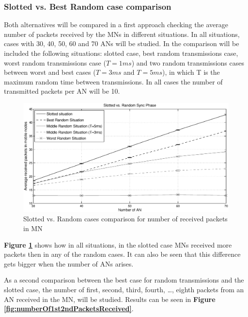 \subsubsection{Slotted vs. Best Random case comparison}

Both alternatives will be compared in a first approach checking the average number of packets received by the \acp{MN} in different situations. In 
all situations, cases with 30, 40, 50, 60 and 70 \acp{AN} will be studied. In the comparison will be included the following situations: 
slotted case, best random transmissions case, worst random transmissions case ($T=1 ms$) and two random transmissions cases between worst and best cases
($T=3ms$ and $T=5ms$), in which T is the maximum random time between transmissions. In all cases the number of transmitted packets per \ac{AN} will be 10.

\begin{figure}[ht]
 \begin{center}
  \includegraphics[width=1\textwidth]{slottedVsRandomAverageReceivedPackets.eps}
 \end{center}
 \caption{Slotted vs. Random cases comparison for number of received packets in \ac{MN}}
 \label{fig:slottedVsRandomAverageReceivedPackets}
\end{figure}

\textbf{Figure \ref{fig:slottedVsRandomAverageReceivedPackets}} shows how in all situations, in the slotted case \acp{MN} received more packets then in
any of the random cases. It can also be seen that this difference gets bigger when the number of \acp{AN} arises.

As a second comparison between the best case for random transmissions and the slotted case, the number of first, second, third, fourth, \ldots, eighth
packets from an \ac{AN} received in the \ac{MN}, will be studied. Results can be seen in \textbf{Figure \ref{fig:numberOf1st2ndPacketsReceived}}.

